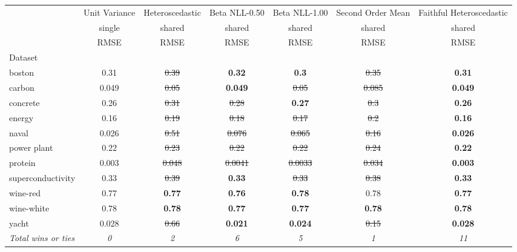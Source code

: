 \begin{tabular}{l|c|c|c|c|c|c}
\toprule
{} & {Unit Variance} & {Heteroscedastic} & {Beta NLL-0.50} & {Beta NLL-1.00} & {Second Order Mean} & {Faithful Heteroscedastic} \\
{} & {single} & {shared} & {shared} & {shared} & {shared} & {shared} \\
{} & {RMSE} & {RMSE} & {RMSE} & {RMSE} & {RMSE} & {RMSE} \\
{Dataset} & {} & {} & {} & {} & {} & {} \\
\midrule
boston & 0.31 & \sout{0.39} & \textbf{0.32} & \textbf{0.3} & \sout{0.35} & \textbf{0.31} \\
carbon & 0.049 & \sout{0.05} & \textbf{0.049} & \sout{0.05} & \sout{0.085} & \textbf{0.049} \\
concrete & 0.26 & \sout{0.31} & \sout{0.28} & \textbf{0.27} & \sout{0.3} & \textbf{0.26} \\
energy & 0.16 & \sout{0.19} & \sout{0.18} & \sout{0.17} & \sout{0.2} & \textbf{0.16} \\
naval & 0.026 & \sout{0.51} & \sout{0.076} & \sout{0.065} & \sout{0.16} & \textbf{0.026} \\
power plant & 0.22 & \sout{0.23} & \sout{0.22} & \sout{0.22} & \sout{0.24} & \textbf{0.22} \\
protein & 0.003 & \sout{0.048} & \sout{0.0041} & \sout{0.0033} & \sout{0.034} & \textbf{0.003} \\
superconductivity & 0.33 & \sout{0.39} & \textbf{0.33} & \sout{0.33} & \sout{0.38} & \textbf{0.33} \\
wine-red & 0.77 & \textbf{0.77} & \textbf{0.76} & \textbf{0.78} & 0.78 & \textbf{0.77} \\
wine-white & 0.78 & \textbf{0.78} & \textbf{0.77} & \textbf{0.77} & \textbf{0.78} & \textbf{0.78} \\
yacht & 0.028 & \sout{0.66} & \textbf{0.021} & \textbf{0.024} & \sout{0.15} & \textbf{0.028} \\
\textit{{Total wins or ties}} & \textit{0} & \textit{2} & \textit{6} & \textit{5} & \textit{1} & \textit{11} \\
\bottomrule
\end{tabular}
